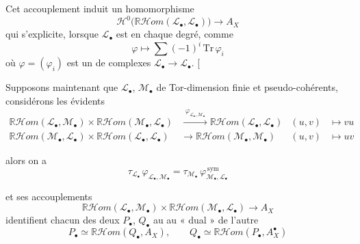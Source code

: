 \documentclass[11pt,a4paper]{article}
\begin{document}
Cet accouplement induit un homomorphisme \uncertain{\ill{}}
\[
\mathcal{H}^{0}\bigl(\mathbb{R}\mathcal{H}om(\mathcal{L}_\bullet, \mathcal{L}_\bullet)\bigr) \longrightarrow A_X
\]
qui s'explicite, lorsque $\mathcal{L}_\bullet$ est   \struck{\ill{}} en chaque degré, comme
\[
\varphi \longmapsto \sum (-1)^i\, \mathrm{Tr}\, \varphi_i
\]
où $\varphi = (\varphi_i)$ est \struck{\ill{}} un  de complexes $\mathcal{L}_\bullet \to \mathcal{L}_\bullet$. [


Supposons maintenant que $\mathcal{L}_\bullet$, $\mathcal{M}_\bullet$  de Tor-dimension finie et pseudo-cohérents, considérons les  évidents
\[
\begin{aligned}
\mathbb{R}\mathcal{H}om(\mathcal{L}_\bullet, \mathcal{M}_\bullet) \times \mathbb{R}\mathcal{H}om(\mathcal{M}_\bullet, \mathcal{L}_\bullet) &\xrightarrow{\;\varphi_{\mathcal{L}_\bullet,\mathcal{M}_\bullet}\;} \mathbb{R}\mathcal{H}om(\mathcal{L}_\bullet, \mathcal{L}_\bullet) & (u,v)&\mapsto vu\\
\mathbb{R}\mathcal{H}om(\mathcal{M}_\bullet, \mathcal{L}_\bullet) \times \mathbb{R}\mathcal{H}om(\mathcal{L}_\bullet, \mathcal{L}_\bullet) &\longrightarrow \mathbb{R}\mathcal{H}om(\mathcal{M}_\bullet, \mathcal{M}_\bullet) & (u,v)&\mapsto uv
\end{aligned}
\]

alors  on a
\[
\tau_{\mathcal{L}_\bullet}\,\varphi_{\mathcal{L}_\bullet,\mathcal{M}_\bullet} = \tau_{\mathcal{M}_\bullet}\,\varphi_{\mathcal{M}_\bullet,\mathcal{L}_\bullet}^{\,\mathrm{sym}}
\]

et ses accouplements  \struck{\ill{}}
\[
\mathbb{R}\mathcal{H}om(\mathcal{L}_\bullet, \mathcal{M}_\bullet) \times \mathbb{R}\mathcal{H}om(\mathcal{M}_\bullet, \mathcal{L}_\bullet) \longrightarrow A_X
\]
identifient chacun des deux  $P_\bullet$, $Q_\bullet$ au   au « dual » de l'autre
\[
P_\bullet \simeq \mathbb{R}\mathcal{H}om(Q_\bullet, A_X), \qquad Q_\bullet \simeq \mathbb{R}\mathcal{H}om(P_\bullet, A_X^\bullet)
\]
\end{document}
